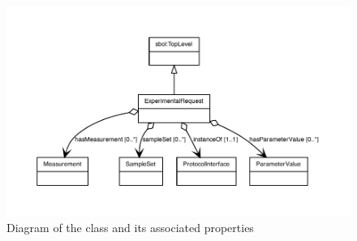 \begin{figure}[ht]
\begin{center}
\includegraphics[scale=0.8]{figures/ExperimentalRequest}
\caption[]{Diagram of the  class and its associated properties}
\label{uml:ExperimentRequest}
\end{center}
\end{figure}


